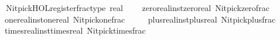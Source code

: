 \begin{isabellebody}
\isanewline
{}\isamarkupfalse%
%
\isadelimproof
\ %
\endisadelimproof
%
\isatagproof
\isacommand{{\isachardot}{\kern0pt}{\isachardot}{\kern0pt}}\isamarkupfalse%
%
\endisatagproof
{\isafoldproof}%
%
\isadelimproof
%
\endisadelimproof
\isanewline
\isanewline
{}\isamarkupfalse%
%
\isadelimdocument
%
\endisadelimdocument
%
\isatagdocument
%
\isamarkuptrue%
%
\endisatagdocument
{\isafolddocument}%
%
\isadelimdocument
%
\endisadelimdocument
%
\isadelimML
%
\endisadelimML
%
\isatagML
{}\isamarkupfalse%
\ {\isacartoucheopen}\isanewline
\ \ Nitpick{\isacharunderscore}{\kern0pt}HOL{\isachardot}{\kern0pt}register{\isacharunderscore}{\kern0pt}frac{\isacharunderscore}{\kern0pt}type\ \isactrltypeUNDERSCOREname {\isasymopen}real{\isasymclose}\isanewline
\ \ \ \ {\isacharbrackleft}{\kern0pt}{\isacharparenleft}{\kern0pt}\isactrlconstUNDERSCOREname {\isasymopen}zero{\isacharunderscore}{\kern0pt}real{\isacharunderscore}{\kern0pt}inst{\isachardot}{\kern0pt}zero{\isacharunderscore}{\kern0pt}real{\isasymclose}{\isacharcomma}{\kern0pt}\ \isactrlconstUNDERSCOREname {\isasymopen}Nitpick{\isachardot}{\kern0pt}zero{\isacharunderscore}{\kern0pt}frac{\isasymclose}{\isacharparenright}{\kern0pt}{\isacharcomma}{\kern0pt}\isanewline
\ \ \ \ \ {\isacharparenleft}{\kern0pt}\isactrlconstUNDERSCOREname {\isasymopen}one{\isacharunderscore}{\kern0pt}real{\isacharunderscore}{\kern0pt}inst{\isachardot}{\kern0pt}one{\isacharunderscore}{\kern0pt}real{\isasymclose}{\isacharcomma}{\kern0pt}\ \isactrlconstUNDERSCOREname {\isasymopen}Nitpick{\isachardot}{\kern0pt}one{\isacharunderscore}{\kern0pt}frac{\isasymclose}{\isacharparenright}{\kern0pt}{\isacharcomma}{\kern0pt}\isanewline
\ \ \ \ \ {\isacharparenleft}{\kern0pt}\isactrlconstUNDERSCOREname {\isasymopen}plus{\isacharunderscore}{\kern0pt}real{\isacharunderscore}{\kern0pt}inst{\isachardot}{\kern0pt}plus{\isacharunderscore}{\kern0pt}real{\isasymclose}{\isacharcomma}{\kern0pt}\ \isactrlconstUNDERSCOREname {\isasymopen}Nitpick{\isachardot}{\kern0pt}plus{\isacharunderscore}{\kern0pt}frac{\isasymclose}{\isacharparenright}{\kern0pt}{\isacharcomma}{\kern0pt}\isanewline
\ \ \ \ \ {\isacharparenleft}{\kern0pt}\isactrlconstUNDERSCOREname {\isasymopen}times{\isacharunderscore}{\kern0pt}real{\isacharunderscore}{\kern0pt}inst{\isachardot}{\kern0pt}times{\isacharunderscore}{\kern0pt}real{\isasymclose}{\isacharcomma}{\kern0pt}\ \isactrlconstUNDERSCOREname {\isasymopen}Nitpick{\isachardot}{\kern0pt}times{\isacharunderscore}{\kern0pt}frac{\isasymclose}{\isacharparenright}{\kern0pt}{\isacharcomma}{\kern0pt}\isanewline

\end{isabellebody}
